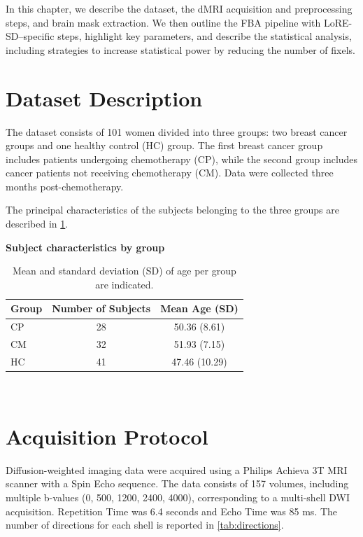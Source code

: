 In this chapter, we describe the dataset, the dMRI acquisition and preprocessing steps, and brain mask extraction. We then outline the FBA pipeline with LoRE-SD–specific steps, highlight key parameters, and describe the statistical analysis, including strategies to increase statistical power by reducing the number of fixels.

\section{Dataset Description}
The dataset consists of 101 women divided into three groups: two breast cancer groups and one healthy control (HC) group. The first breast cancer group includes patients undergoing chemotherapy (CP), while the second group includes cancer patients not receiving chemotherapy (CM). Data were collected three months post-chemotherapy.

The principal characteristics of the subjects belonging to the three groups are described in \cref{tab:dataset}.

\begin{table}[H]
    \caption*{\textbf{Subject characteristics by group}} %
    \centering 
    \begin{tabular}{|p{6em} c c|} %
    \hline
    \rowcolor{bluepoli!40} %
    \textbf{Group} & \textbf{Number of Subjects} & \textbf{Mean Age (SD)} \T\B \\
    \hline \hline
    CP & 28 & 50.36 (8.61) \T\B \\
    CM & 32 & 51.93 (7.15) \T\B \\
    HC & 41 & 47.46 (10.29) \B \\
    \hline
    \end{tabular}
    \\[10pt]
    \caption{Mean and standard deviation (SD) of age per group are indicated.}
    \label{tab:dataset}
\end{table}

\section{Acquisition Protocol}
Diffusion-weighted imaging data were acquired using a Philips Achieva 3T MRI scanner with a Spin Echo sequence. The data consists of 157 volumes, including multiple b-values (0, 500, 1200, 2400, 4000), corresponding to a multi-shell DWI acquisition. Repetition Time was 6.4 seconds and Echo Time was 85 ms. The number of directions for each shell is reported in \cref{tab:directions}.

